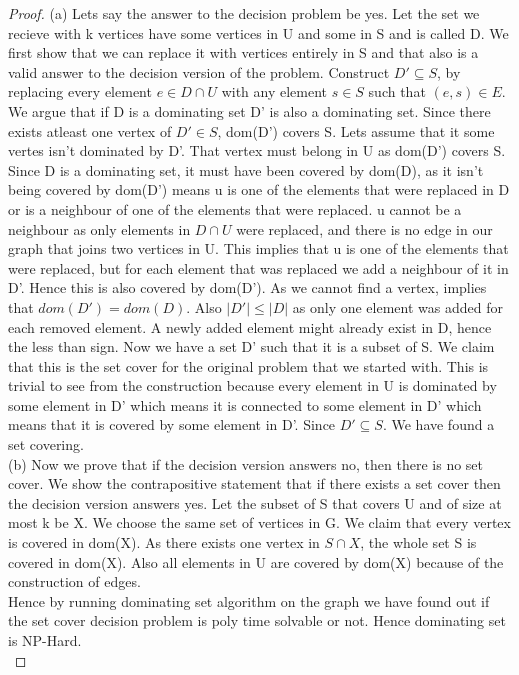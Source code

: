 \documentclass[solution,addpoints,12pt]{exam}
\begin{document}
\begin{questions}
\begin{parts}
\begin{solution}
\begin{proof}
  (a) Lets say the answer to the decision problem be yes. Let the set we recieve with k vertices have some vertices in U and some in S and is called D. We first show that we can replace it with vertices entirely in S and that also is a valid answer to the decision version of the problem. Construct $D' \subseteq S$, by replacing every element $e \in D \cap U$ with any element $s \in S$ such that $(e,s) \in E$. We argue that if D is a dominating set D' is also a dominating set. Since there exists atleast one vertex of $D' \in S$, dom(D') covers S. Lets assume that it some vertes isn't dominated by D'. That vertex must belong in U as dom(D') covers S. Since D is a dominating set, it must have been covered by dom(D), as it isn't being covered by dom(D') means u is one of the elements that were replaced in D or is a neighbour of one of the elements that were replaced. u cannot be a neighbour as only elements in $D \cap U$ were replaced, and there is no edge in our graph that joins two vertices in U. This implies that u is one of the elements that were replaced, but for each element that was replaced we add a neighbour of it in D'. Hence this is also covered by dom(D'). As we cannot find a vertex, implies that $dom(D') = dom(D)$. Also $|D'| \leq |D|$ as only one element was added for each removed element. A newly added element might already exist in D, hence the less than sign. Now we have a set D' such that it is a subset of S. We claim that this is the set cover for the original problem that we started with. This is trivial to see from the construction because every element in U is dominated by some element in D' which means it is connected to some element in D' which means that it is covered by some element in D'. Since $D' \subseteq S$. We have found a set covering. 
  \\
  (b) Now we prove that if the decision version answers no, then there is no set cover. We show the contrapositive statement that if there exists a set cover then the decision version answers yes. Let the subset of S that covers U and of size at most k be X. We choose the same set of vertices in G. We claim that every vertex is covered in dom(X). As there exists one vertex in $S \cap X$, the whole set S is covered in dom(X). Also all elements in U are covered by dom(X) because of the construction of edges. 
\\
Hence by running dominating set algorithm on the graph we have found out if the set cover decision problem is poly time solvable or not. Hence dominating set is NP-Hard.
\\

\end{proof}
\end{solution}
\end{parts}
\end{questions}
\end{document}
